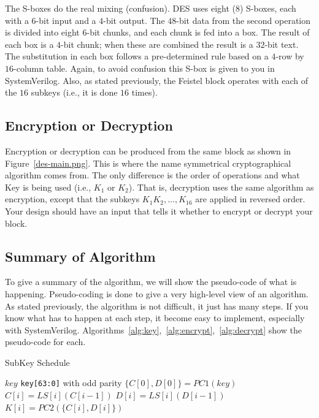 \documentclass{article}
\begin{document}
The S-boxes do the real mixing (confusion). DES uses eight ($8$)
S-boxes, each
with a $6$-bit input and
a $4$-bit output.  The $48$-bit data from the second operation is divided
into eight $6$-bit chunks, and each chunk is fed into a box. The result
of each box is a $4$-bit chunk; when these are combined the result is a
$32$-bit text. The substitution in each box follows a pre-determined
rule based on a $4$-row by $16$-column table.  Again, to avoid
confusion this S-box is given to you in SystemVerilog.
Also, as stated previously, the Feistel block operates with each of
the $16$ subkeys (i.e., it is done $16$ times).

\subsection{Encryption or Decryption}

Encryption or decryption can be produced from the same block as shown in
Figure~\ref{des-main.png}.  This is where the name symmetrical
cryptographical algorithm comes from.  The only difference is the
order of operations and what Key is being
used (i.e., $K_1$ or $K_2$).
That is, decryption uses the same algorithm as encryption, except that
the subkeys $K_1 K_2, \ldots, K_{16}$ are applied in reversed order.
Your design should have an input that tells it whether to
encrypt or decrypt your block.

\subsection{Summary of Algorithm}

To give a summary of the algorithm, we will show the pseudo-code of
what is happening.  Pseudo-coding is done to give a very high-level
view of an algorithm.  As stated previously, the algorithm is not
difficult, it just has many steps.  If you know what has to happen at
each step, it become easy to implement, especially with SystemVerilog.
Algorithms~\ref{alg:key},~\ref{alg:encrypt},~\ref{alg:decrypt} show
the pseudo-code for each.  
\begin{algorithm}
\caption{SubKey Schedule}\label{alg:key}
\begin{algorithmic}
\Require $key$
\Ensure \verb!key[63:0]! with odd parity
\State $\{C[0], D[0]\} = PC1(key)$
\State $C[i] = LS[i](C[i-1])$
\State $D[i] = LS[i](D[i-1])$
\State $K[i] = PC2(\{C[i], D[i]\})$
\EndFor
\end{algorithmic}
\end{algorithm}
\end{document}
